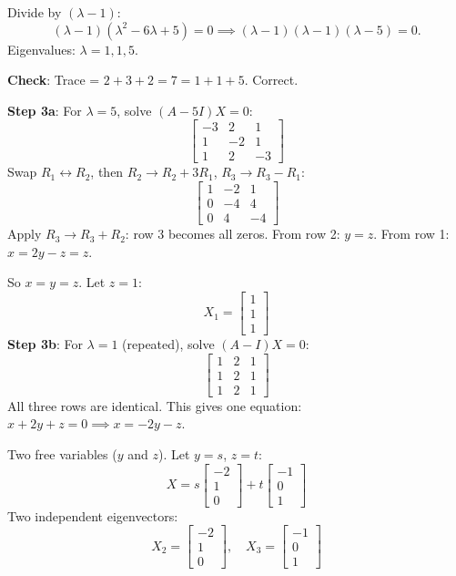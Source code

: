 \documentclass[
]{article}
\begin{document}
Divide by \((\lambda - 1)\):
\[
(\lambda - 1)(\lambda^2 - 6\lambda + 5) = 0 \implies (\lambda - 1)(\lambda - 1)(\lambda - 5) = 0.
\]
Eigenvalues: \(\lambda = 1, 1, 5\).

\textbf{Check}: Trace = \(2 + 3 + 2 = 7 = 1 + 1 + 5\). Correct.

\textbf{Step 3a}: For \(\lambda = 5\), solve \((A - 5I)X = 0\):
\[
\begin{bmatrix}
-3 & 2 & 1 \\
1 & -2 & 1 \\
1 & 2 & -3
\end{bmatrix}
\]
Swap \(R_1 \leftrightarrow R_2\), then \(R_2 \to R_2 + 3R_1\),
\(R_3 \to R_3 - R_1\):
\[
\begin{bmatrix}
1 & -2 & 1 \\
0 & -4 & 4 \\
0 & 4 & -4
\end{bmatrix}
\]
Apply \(R_3 \to R_3 + R_2\): row 3 becomes all zeros. From row 2:
\(y = z\). From row 1: \(x = 2y - z = z\).

So \(x = y = z\). Let \(z = 1\):
\[
X_1 =
\begin{bmatrix}
1 \\
1 \\
1
\end{bmatrix}
\]
\textbf{Step 3b}: For \(\lambda = 1\) (repeated), solve
\((A - I)X = 0\):
\[
\begin{bmatrix}
1 & 2 & 1 \\
1 & 2 & 1 \\
1 & 2 & 1
\end{bmatrix}
\]
All three rows are identical. This gives one equation:
\(x + 2y + z = 0 \implies x = -2y - z\).

Two free variables (\(y\) and \(z\)). Let \(y = s\), \(z = t\):
\[
X = s
\begin{bmatrix}
-2 \\
1 \\
0
\end{bmatrix} + t \begin{bmatrix} -1 \\ 0 \\ 1 \end{bmatrix}
\]
Two independent eigenvectors:
\[
X_2 =
\begin{bmatrix}
-2 \\
1 \\
0
\end{bmatrix}, \quad X_3 = \begin{bmatrix} -1 \\ 0 \\ 1 \end{bmatrix}
\]
\end{document}
